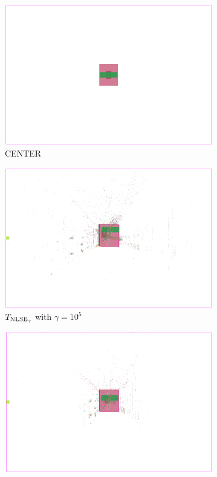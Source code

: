 \begin{figure}
 \begin{subfigure}{.32\textwidth}
  \includegraphics[width=\textwidth]{start_vectors/convergence_Chip1_center.png}  
  \caption{CENTER}
 \end{subfigure}
 \hfill
 \begin{subfigure}{.32\textwidth}
  \includegraphics[width=\textwidth]{start_vectors/convergence_Chip1_LSE_center_100000_gamma.png}  
  \caption{\(T_{\operatorname{NLSE}_\gamma}\) with \(\gamma = 10^5\)}
 \end{subfigure}
 \hfill
 \begin{subfigure}{.32\textwidth}
  \includegraphics[width=\textwidth]{start_vectors/convergence_Chip1_WA_center_100000_gamma.png}  

\end{subfigure}
\end{figure}
